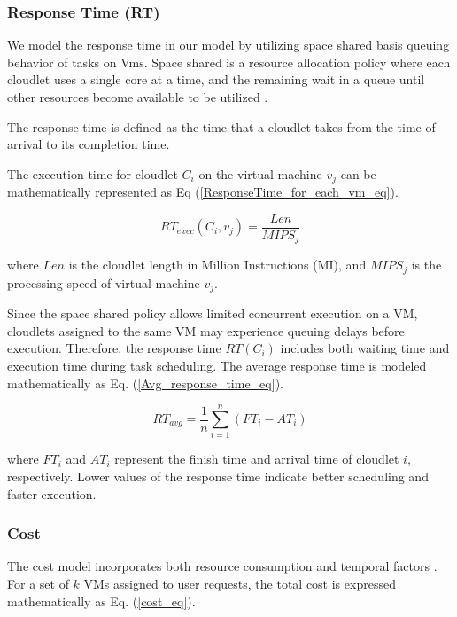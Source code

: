 \documentclass[pdflatex,sn-mathphys-num]{sn-jnl}%
\begin{document}
\subsubsection{Response Time (RT)}\label{subsubsec3.2.3}

 We model the response time in our model by utilizing space shared basis queuing behavior of tasks on Vms. Space shared is a resource allocation policy where each cloudlet uses a single core at a time, and the remaining wait in a queue until other resources become available to be utilized \cite{space-shared}.

The response time is defined as the time that a cloudlet takes from the time of arrival to its completion time. 

The execution time for cloudlet $C_i$ on the virtual machine $v_j$ can be mathematically represented as Eq (\ref{ResponseTime_for_each_vm_eq}).

\begin{equation} \label{ResponseTime_for_each_vm_eq}
RT_{exec}(C_i, v_j) = \frac{Len}{MIPS_j}
\end{equation}

where $Len$ is the cloudlet length in Million Instructions (MI), and $MIPS_j$ is the processing speed of virtual machine $v_j$.

Since the space shared policy allows limited concurrent execution on a VM, cloudlets assigned to the same VM may experience queuing delays before execution. Therefore, the response time $RT(C_i)$ includes both waiting time and execution time during task scheduling. The average response time is modeled mathematically as Eq. (\ref{Avg_response_time_eq}).

\begin{equation} \label{Avg_response_time_eq}
RT_{avg} = \frac{1}{n} \sum_{i=1}^{n} (FT_i - AT_i)
\end{equation}

where \(FT_i\) and \(AT_i\) represent the finish time and arrival time of cloudlet \(i\), respectively. Lower values of the response time indicate better scheduling and faster execution.

\subsubsection{Cost}\label{subsubsec3.2.4}

The cost model incorporates both resource consumption and temporal factors \cite{GWO}. For a set of \( k \) VMs assigned to user requests, the total cost is expressed mathematically as Eq. (\ref{cost_eq}).
\end{document}
